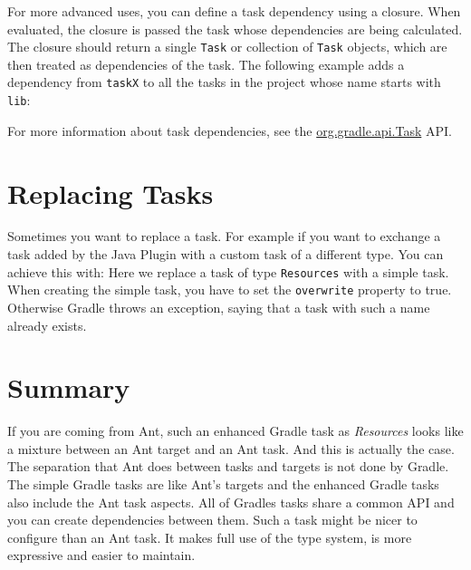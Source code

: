 For more advanced uses, you can define a task dependency using a closure. When evaluated, the closure is passed the task
whose dependencies are being calculated. The closure should return a single \texttt{Task} or collection of \texttt{Task}
objects, which are then treated as dependencies of the task.  The following example adds a dependency from \texttt{taskX}
to all the tasks in the project whose name starts with \texttt{lib}:

For more information about task dependencies, see the \href{\API Task.html}{org.gradle.api.Task} API.


\section{Replacing Tasks}
Sometimes you want to replace a task. For example if you want to exchange a task added by the Java Plugin with a custom task of a different type. You can achieve this with:
Here we replace a task of type \texttt{Resources} with a simple task. When creating the simple task, you have to set the \texttt{overwrite} property to true. Otherwise Gradle throws an exception, saying that a task with such a name already exists.

\section{Summary} %
\label{sec:the_idea_behind_gradle_tasks}
If you are coming from Ant, such an enhanced Gradle task as \emph{Resources} looks like a mixture between an Ant target and an Ant task. And this is actually the case. The separation that Ant does between tasks and targets is not done by Gradle. The simple Gradle tasks are like Ant's targets and the enhanced Gradle tasks also include the Ant task aspects. All of Gradles tasks share a common API and you can create dependencies between them. Such a task might be nicer to configure than an Ant task. It makes full use of the type system, is more expressive and easier to maintain.



